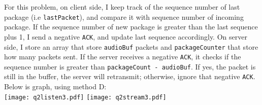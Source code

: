 \documentclass[12pt]{article}
\newenvironment{problem}[2][Problem]{\begin{trivlist}
\item[\hskip \labelsep {\bfseries #1}\hskip \labelsep {\bfseries #2.}]}{\end{trivlist}}
\begin{document}
\begin{problem}{2}
    For this problem, on client side, I keep track of the sequence number of last package (i.e \texttt{lastPacket}), and compare it with sequence number of incoming package. If the sequence number of new package is greater than the last sequence plus 1, I send a  negative \texttt{ACK}, and update last sequence accordingly. 
    On server side, I store an array that store \texttt{audioBuf} packets and \texttt{packageCounter} that store how many packets sent. If the server receives a negative \texttt{ACK}, it checks if the sequence number is greater than \texttt{packageCount - audioBuf}. If yes, the packet is still in the buffer, the server will retransmit; otherwise, ignore that negative \texttt{ACK}.    
    \\
    Below is graph, using method D:\\
    \texttt{[image: q2listen3.pdf]}
    \texttt{[image: q2stream3.pdf]}
\end{problem}
\end{document}
